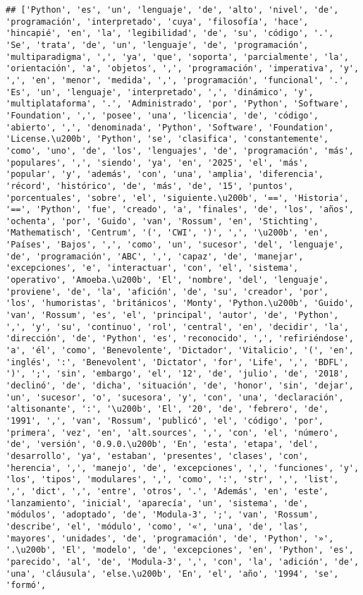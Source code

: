 \documentclass[
]{article}
\begin{document}
\begin{verbatim}
## ['Python', 'es', 'un', 'lenguaje', 'de', 'alto', 'nivel', 'de', 'programación', 'interpretado', 'cuya', 'filosofía', 'hace', 'hincapié', 'en', 'la', 'legibilidad', 'de', 'su', 'código', '.', 'Se', 'trata', 'de', 'un', 'lenguaje', 'de', 'programación', 'multiparadigma', ',', 'ya', 'que', 'soporta', 'parcialmente', 'la', 'orientación', 'a', 'objetos', ',', 'programación', 'imperativa', 'y', ',', 'en', 'menor', 'medida', ',', 'programación', 'funcional', '.', 'Es', 'un', 'lenguaje', 'interpretado', ',', 'dinámico', 'y', 'multiplataforma', '.', 'Administrado', 'por', 'Python', 'Software', 'Foundation', ',', 'posee', 'una', 'licencia', 'de', 'código', 'abierto', ',', 'denominada', 'Python', 'Software', 'Foundation', 'License.\u200b', 'Python', 'se', 'clasifica', 'constantemente', 'como', 'uno', 'de', 'los', 'lenguajes', 'de', 'programación', 'más', 'populares', ',', 'siendo', 'ya', 'en', '2025', 'el', 'más', 'popular', 'y', 'además', 'con', 'una', 'amplia', 'diferencia', 'récord', 'histórico', 'de', 'más', 'de', '15', 'puntos', 'porcentuales', 'sobre', 'el', 'siguiente.\u200b', '==', 'Historia', '==', 'Python', 'fue', 'creado', 'a', 'finales', 'de', 'los', 'años', 'ochenta', 'por', 'Guido', 'van', 'Rossum', 'en', 'Stichting', 'Mathematisch', 'Centrum', '(', 'CWI', ')', ',', '\u200b', 'en', 'Países', 'Bajos', ',', 'como', 'un', 'sucesor', 'del', 'lenguaje', 'de', 'programación', 'ABC', ',', 'capaz', 'de', 'manejar', 'excepciones', 'e', 'interactuar', 'con', 'el', 'sistema', 'operativo', 'Amoeba.\u200b', 'El', 'nombre', 'del', 'lenguaje', 'proviene', 'de', 'la', 'afición', 'de', 'su', 'creador', 'por', 'los', 'humoristas', 'británicos', 'Monty', 'Python.\u200b', 'Guido', 'van', 'Rossum', 'es', 'el', 'principal', 'autor', 'de', 'Python', ',', 'y', 'su', 'continuo', 'rol', 'central', 'en', 'decidir', 'la', 'dirección', 'de', 'Python', 'es', 'reconocido', ',', 'refiriéndose', 'a', 'él', 'como', 'Benevolente', 'Dictador', 'Vitalicio', '(', 'en', 'inglés', ':', 'Benevolent', 'Dictator', 'for', 'Life', ',', 'BDFL', ')', ';', 'sin', 'embargo', 'el', '12', 'de', 'julio', 'de', '2018', 'declinó', 'de', 'dicha', 'situación', 'de', 'honor', 'sin', 'dejar', 'un', 'sucesor', 'o', 'sucesora', 'y', 'con', 'una', 'declaración', 'altisonante', ':', '\u200b', 'El', '20', 'de', 'febrero', 'de', '1991', ',', 'van', 'Rossum', 'publicó', 'el', 'código', 'por', 'primera', 'vez', 'en', 'alt.sources', ',', 'con', 'el', 'número', 'de', 'versión', '0.9.0.\u200b', 'En', 'esta', 'etapa', 'del', 'desarrollo', 'ya', 'estaban', 'presentes', 'clases', 'con', 'herencia', ',', 'manejo', 'de', 'excepciones', ',', 'funciones', 'y', 'los', 'tipos', 'modulares', ',', 'como', ':', 'str', ',', 'list', ',', 'dict', ',', 'entre', 'otros', '.', 'Además', 'en', 'este', 'lanzamiento', 'inicial', 'aparecía', 'un', 'sistema', 'de', 'módulos', 'adoptado', 'de', 'Modula-3', ';', 'van', 'Rossum', 'describe', 'el', 'módulo', 'como', '«', 'una', 'de', 'las', 'mayores', 'unidades', 'de', 'programación', 'de', 'Python', '»', '.\u200b', 'El', 'modelo', 'de', 'excepciones', 'en', 'Python', 'es', 'parecido', 'al', 'de', 'Modula-3', ',', 'con', 'la', 'adición', 'de', 'una', 'cláusula', 'else.\u200b', 'En', 'el', 'año', '1994', 'se', 'formó', 
\end{verbatim}
\end{document}
